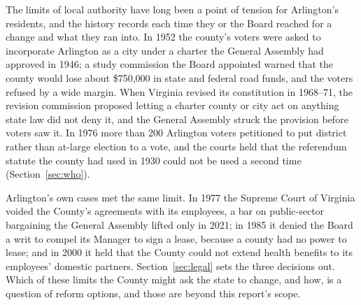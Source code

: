 The limits of local authority have long been a point of tension for Arlington's
residents, and the history records each time they or the Board reached for a
change and what they ran into. In 1952 the county's voters were asked to
incorporate Arlington as a city under a charter the General Assembly had approved
in 1946; a study commission the Board appointed warned that the county would lose
about \$750,000 in state and federal road funds, and the voters refused by a wide
margin.\autocite{dailysun1952results} When Virginia revised its constitution in
1968--71, the revision commission proposed letting a charter county or city act on
anything state law did not deny it, and the General Assembly struck the provision
before voters saw it.\autocite[200]{schragger2022} In 1976 more than 200 Arlington
voters petitioned to put district rather than at-large election to a vote, and the
courts held that the referendum statute the county had used in 1930 could not be
used a second time (Section~\ref{sec:who}).\autocite{vollinelectoralboard}

Arlington's own cases met the same limit. In 1977 the Supreme Court of Virginia
voided the County's agreements with its employees, a bar on public-sector
bargaining the General Assembly lifted only in
2021;\autocite{commonwealthvarlington1977} in 1985 it denied the Board a writ to
compel its Manager to sign a lease, because a county had no power to
lease;\autocite{brownvarlington1985} and in 2000 it held that the County could not
extend health benefits to its employees' domestic
partners.\autocite{arlingtonvwhite2000} Section~\ref{sec:legal} sets the three
decisions out. Which of these limits the County might ask the state to change, and
how, is a question of reform options, and those are beyond this report's scope.

